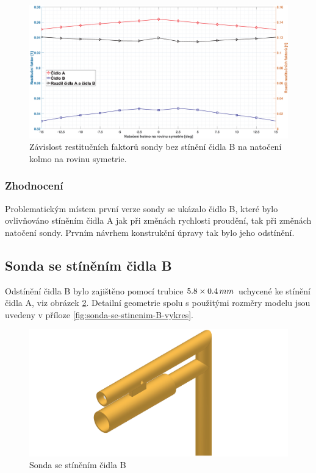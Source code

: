              \begin{figure}[ht!]
                \centering
                \includegraphics*[width=\textwidth]{400_SIMULACE_KONSTRUKCNICH_UPRAV/Grafy/01_kolma_rovina}
                \caption{Závislost restitučních faktorů sondy bez stínění čidla B na natočení kolmo na rovinu symetrie.}
                \label{fig:sonda-bez-stineni-kolma-rovina}
            \end{figure}

        \subsubsection{Zhodnocení}
            Problematickým místem první verze sondy se ukázalo čidlo B, které bylo ovlivňováno stíněním čidla A jak při změnách rychlosti proudění, tak při změnách natočení sondy. Prvním návrhem konstrukční úpravy tak bylo jeho odstínění.
    \newpage
    \subsection{Sonda se stíněním čidla B}
        Odstínění čidla B bylo zajištěno pomocí trubice $5.8 \times 0.4 \, mm$ uchycené ke stínění čidla A, viz obrázek \ref{fig:sonda-se-stinenim-B}. Detailní geometrie spolu s použitými rozměry modelu jsou uvedeny v příloze \ref{fig:sonda-se-stinenim-B-vykres}. 
        
        \begin{figure}[ht!]
            \centering
            \includegraphics[width=\textwidth]{400_SIMULACE_KONSTRUKCNICH_UPRAV/Vykresy_rendery/Sonda_se_stinenim_B.png}
            \caption{Sonda se stíněním čidla B}
            \label{fig:sonda-se-stinenim-B}
        \end{figure}

